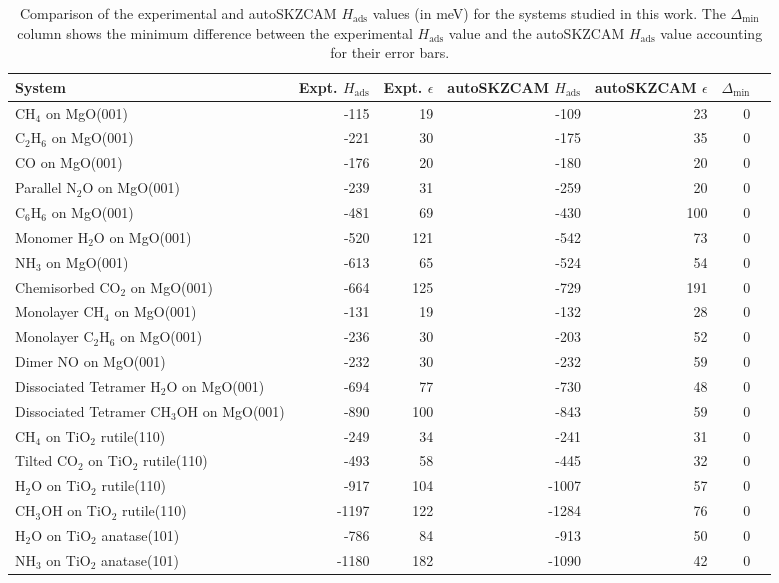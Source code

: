 \begin{table}
\caption{\label{tab:hads_comparison}Comparison of the experimental and autoSKZCAM $H_\textrm{ads}$ values (in meV) for the systems studied in this work. The $\Delta_\textrm{min}$ column shows the minimum difference between the experimental $H_\textrm{ads}$ value and the autoSKZCAM $H_\textrm{ads}$ value accounting for their error bars.}
\begin{adjustbox}{center,max width=0.9\textwidth}
\begin{tabular}{lrrrrrr}
\toprule
System & Expt. $H_\textrm{ads}$ & Expt. $\epsilon$ & autoSKZCAM $H_\textrm{ads}$ & autoSKZCAM $\epsilon$ & $\Delta_\textrm{min}$ \\ 
\midrule
CH$_4$ on MgO(001) & -115 & 19 & -109 & 23 & 0 \\
C$_2$H$_6$ on MgO(001) & -221 & 30 & -175 & 35 & 0 \\
CO on MgO(001) & -176 & 20 & -180 & 20 & 0 \\
Parallel N$_2$O on MgO(001) & -239 & 31 & -259 & 20 & 0 \\
C$_6$H$_6$ on MgO(001) & -481 & 69 & -430 & 100 & 0 \\
Monomer H$_2$O on MgO(001) & -520 & 121 & -542 & 73 & 0 \\
NH$_3$ on MgO(001) & -613 & 65 & -524 & 54 & 0 \\
Chemisorbed CO$_2$ on MgO(001) & -664 & 125 & -729 & 191 & 0 \\
Monolayer CH$_4$ on MgO(001) & -131 & 19 & -132 & 28 & 0 \\
Monolayer C$_2$H$_6$ on MgO(001) & -236 & 30 & -203 & 52 & 0 \\
Dimer NO on MgO(001) & -232 & 30 & -232 & 59 & 0 \\
Dissociated Tetramer H$_2$O on MgO(001) & -694 & 77 & -730 & 48 & 0 \\
Dissociated Tetramer CH$_3$OH on MgO(001) & -890 & 100 & -843 & 59 & 0 \\
CH$_4$ on TiO$_2$ rutile(110) & -249 & 34 & -241 & 31 & 0 \\
Tilted CO$_2$ on TiO$_2$ rutile(110) & -493 & 58 & -445 & 32 & 0 \\
H$_2$O on TiO$_2$ rutile(110) & -917 & 104 & -1007 & 57 & 0 \\
CH$_3$OH on TiO$_2$ rutile(110) & -1197 & 122 & -1284 & 76 & 0 \\
H$_2$O on TiO$_2$ anatase(101) & -786 & 84 & -913 & 50 & 0 \\
NH$_3$ on TiO$_2$ anatase(101) & -1180 & 182 & -1090 & 42 & 0 \\
\bottomrule
\end{tabular}
\end{adjustbox}
\end{table}